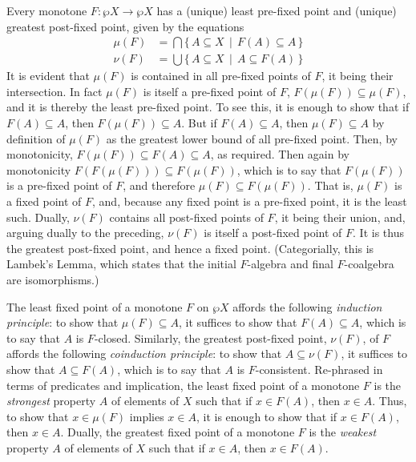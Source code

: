 \documentclass[11pt,twoside]{article}
\begin{document}
Every monotone $F:\wp{X}\to\wp{X}$ has a (unique) least pre-fixed point and (unique)
greatest post-fixed point, given by the equations
\begin{align*}
  \mu(F) & = \bigcap\{\,A\subseteq X\,\mid\, F(A)\subseteq A\,\} \\
  \nu(F) & = \bigcup\{\,A\subseteq X\,\mid\,A\subseteq F(A)\,\}
\end{align*}
It is evident that $\mu(F)$ is contained in all pre-fixed points of $F$, it being their
intersection.  In fact $\mu(F)$ is itself a pre-fixed point of $F$,
$F(\mu(F))\subseteq \mu(F)$, and it is thereby the least pre-fixed point.  To see this, it is enough
to show that if $F(A)\subseteq A$, then $F(\mu(F))\subseteq A$.  But if $F(A)\subseteq A$, then
$\mu(F)\subseteq A$ by definition of $\mu(F)$ as the greatest lower bound of all pre-fixed point.
Then, by monotonicity, $F(\mu(F))\subseteq F(A)\subseteq A$, as required.  Then again by monotonicity
$F(F(\mu(F)))\subseteq F(\mu(F))$, which is to say that $F(\mu(F))$ is a pre-fixed point of
$F$, and therefore $\mu(F)\subseteq F(\mu(F))$.  That is, $\mu(F)$ is a fixed point of
$F$, and, because any fixed point is a pre-fixed point, it is the least such.  Dually,
$\nu(F)$ contains all post-fixed points of $F$, it being their union, and, arguing dually to
the preceding, $\nu(F)$ is itself a post-fixed point of $F$.  It is thus the greatest
post-fixed point, and hence a fixed point.  (Categorially, this is Lambek's Lemma, which
states that the initial $F$-algebra and final $F$-coalgebra are isomorphisms.)

\smallskip

The least fixed point of a monotone $F$ on $\wp{X}$ affords the following \emph{induction
  principle}: to show that $\mu(F)\subseteq A$, it suffices to show that
$F(A)\subseteq A$, which is to say that $A$ is $F$-closed.  Similarly, the greatest post-fixed
point, $\nu(F)$, of $F$ affords the following \emph{coinduction principle}: to show that
$A\subseteq \nu(F)$, it suffices to show that $A\subseteq F(A)$, which is to say that $A$ is
$F$-consistent.  Re-phrased in terms of predicates and implication, the least fixed point
of a monotone $F$ is the \emph{strongest} property $A$ of elements of $X$ such that if
$x\in F(A)$, then $x\in A$. Thus, to show that $x\in\mu(F)$ implies $x\in A$, it is enough to show
that if $x\in F(A)$, then $x\in A$.  Dually, the greatest fixed point of a monotone $F$ is the
\emph{weakest} property $A$ of elements of $X$ such that if $x\in A$, then $x\in F(A)$.
\end{document}
